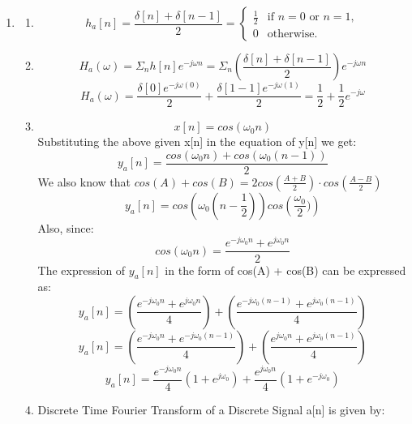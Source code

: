 \documentclass{article}
\begin{document}
\begin{enumerate}
    \begin{enumerate}
        \item 
        \begin{enumerate}
            \item 
                \[
                    h_a[n] = \frac{\delta[n] + \delta[n-1]}{2} 
                        = 
                        \begin{cases} 
                        \frac{1}{2} & \text{if } n = 0 \text{ or } n = 1, \\
                        0 & \text{otherwise.}
                        \end{cases}
                \]
            \item 
                \[
                    H_a(\omega) = \Sigma_nh[n]e^{-j\omega n} = \Sigma_n(\frac{\delta[n] + \delta[n-1]}{2})e^{-j\omega n}
                \]
                \[
                    H_a(\omega) = \frac{ \delta[0]e^{-j\omega (0)} }{2} + \frac{ \delta[1-1]e^{-j\omega (1)} }{2} = \frac{1}{2} + \frac{1}{2}e^{-j\omega}
                \]
            \item
                \[
                    x[n] = cos(\omega_0n)
                \]
                Substituting the above given x[n] in the equation of y[n] we get:
                \[
                    y_a[n] = \frac{ cos(\omega_0n) + cos(\omega_0(n-1)) }{2}
                \]
                We also know that $cos(A) + cos(B) = 2 cos\left(\frac{A + B}{2} \right) \cdot cos\left( \frac{A-B}{2} \right)$
                \[
                    y_a[n] = cos\left(\omega_0( n - \frac{1}{2} )\right)cos\left(\frac{\omega_0}{2} )\right)
                \]
                Also, since: 
                \[
                    cos(\omega_0 n) = \frac{e^{-j\omega_0n} + e^{j\omega_0n}}{2}
                \]
                The expression of $y_a[n]$ in the form of cos(A) + cos(B) can be expressed as:
                \[
                    y_a[n] = \left( \frac{ e^{-j\omega_0n} + e^{j\omega_0n}}{4} \right) + \left( \frac{ e^{-j\omega_0(n-1)} + e^{j\omega_0(n-1)}}{4} \right)
                \]
                \[
                    y_a[n] = \left( \frac{ e^{-j\omega_0n} + e^{-j\omega_0(n-1)}}{4} \right) + \left( \frac{ e^{j\omega_0n} + e^{j\omega_0(n-1)}}{4} \right)
                \]
                \[
                    y_a[n] = \frac{e^{-j\omega_0n}}{4} \left( 1 + e^{j\omega_0} \right) + \frac{e^{j\omega_0n}}{4} \left( 1 + e^{-j\omega_0} \right)
                \]
            \item
                Discrete Time Fourier Transform of a Discrete Signal a[n] is given by:

\end{enumerate}
\end{enumerate}
\end{enumerate}
\end{document}
